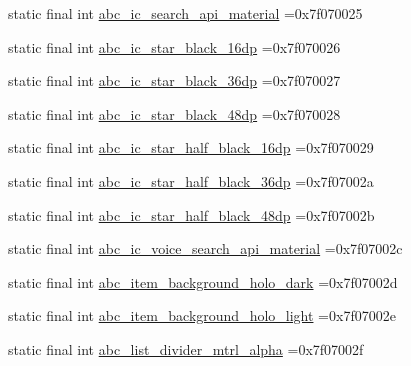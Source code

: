 \begin{DoxyCompactItemize}
\item 
static final int \mbox{\hyperlink{classcom_1_1example_1_1trainawearapplication_1_1_r_1_1drawable_a0c4cc93bab36e19a86d906263e13f458}{abc\+\_\+ic\+\_\+search\+\_\+api\+\_\+material}} =0x7f070025
\item 
static final int \mbox{\hyperlink{classcom_1_1example_1_1trainawearapplication_1_1_r_1_1drawable_adaed7ac71a58cc7df9913e033b3e9c67}{abc\+\_\+ic\+\_\+star\+\_\+black\+\_\+16dp}} =0x7f070026
\item 
static final int \mbox{\hyperlink{classcom_1_1example_1_1trainawearapplication_1_1_r_1_1drawable_a30d86ec400159a35f563dc4279bbb445}{abc\+\_\+ic\+\_\+star\+\_\+black\+\_\+36dp}} =0x7f070027
\item 
static final int \mbox{\hyperlink{classcom_1_1example_1_1trainawearapplication_1_1_r_1_1drawable_aa2d0a78623f6320cfd0a3f50a0aaf900}{abc\+\_\+ic\+\_\+star\+\_\+black\+\_\+48dp}} =0x7f070028
\item 
static final int \mbox{\hyperlink{classcom_1_1example_1_1trainawearapplication_1_1_r_1_1drawable_a88d9db02172e39558275fae62281ed4e}{abc\+\_\+ic\+\_\+star\+\_\+half\+\_\+black\+\_\+16dp}} =0x7f070029
\item 
static final int \mbox{\hyperlink{classcom_1_1example_1_1trainawearapplication_1_1_r_1_1drawable_ad810f45be18cf8157d918f7d1eae3d4b}{abc\+\_\+ic\+\_\+star\+\_\+half\+\_\+black\+\_\+36dp}} =0x7f07002a
\item 
static final int \mbox{\hyperlink{classcom_1_1example_1_1trainawearapplication_1_1_r_1_1drawable_accc72a5f7fb95e26887c7de3c71de417}{abc\+\_\+ic\+\_\+star\+\_\+half\+\_\+black\+\_\+48dp}} =0x7f07002b
\item 
static final int \mbox{\hyperlink{classcom_1_1example_1_1trainawearapplication_1_1_r_1_1drawable_a0ab047eec100f5d0594cd22aeaa4c3d5}{abc\+\_\+ic\+\_\+voice\+\_\+search\+\_\+api\+\_\+material}} =0x7f07002c
\item 
static final int \mbox{\hyperlink{classcom_1_1example_1_1trainawearapplication_1_1_r_1_1drawable_a12b57fa64a28a420d40f3ef3b235a048}{abc\+\_\+item\+\_\+background\+\_\+holo\+\_\+dark}} =0x7f07002d
\item 
static final int \mbox{\hyperlink{classcom_1_1example_1_1trainawearapplication_1_1_r_1_1drawable_a0ec076022e1b10d729a62b556363b445}{abc\+\_\+item\+\_\+background\+\_\+holo\+\_\+light}} =0x7f07002e
\item 
static final int \mbox{\hyperlink{classcom_1_1example_1_1trainawearapplication_1_1_r_1_1drawable_a02e65ce75c3acfac9e70c37d5f28298a}{abc\+\_\+list\+\_\+divider\+\_\+mtrl\+\_\+alpha}} =0x7f07002f

\end{DoxyCompactItemize}
